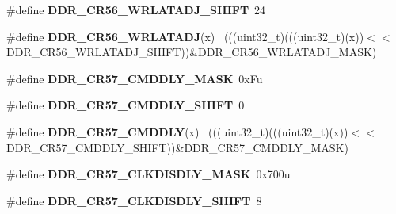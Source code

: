 \begin{DoxyCompactItemize}
\item 
\hypertarget{group___d_d_r___register___masks_ga09364cd52f56f3b15b0b7296675c16e8}{}\#define {\bfseries D\+D\+R\+\_\+\+C\+R56\+\_\+\+W\+R\+L\+A\+T\+A\+D\+J\+\_\+\+S\+H\+I\+F\+T}~24\label{group___d_d_r___register___masks_ga09364cd52f56f3b15b0b7296675c16e8}

\item 
\hypertarget{group___d_d_r___register___masks_ga6ff1818da114c647778871bdb9afc7b0}{}\#define {\bfseries D\+D\+R\+\_\+\+C\+R56\+\_\+\+W\+R\+L\+A\+T\+A\+D\+J}(x)                                      ~(((uint32\+\_\+t)(((uint32\+\_\+t)(x))$<$$<$D\+D\+R\+\_\+\+C\+R56\+\_\+\+W\+R\+L\+A\+T\+A\+D\+J\+\_\+\+S\+H\+I\+F\+T))\&D\+D\+R\+\_\+\+C\+R56\+\_\+\+W\+R\+L\+A\+T\+A\+D\+J\+\_\+\+M\+A\+S\+K)\label{group___d_d_r___register___masks_ga6ff1818da114c647778871bdb9afc7b0}

\item 
\hypertarget{group___d_d_r___register___masks_ga645c0dd904e468fae0f64fd100a80577}{}\#define {\bfseries D\+D\+R\+\_\+\+C\+R57\+\_\+\+C\+M\+D\+D\+L\+Y\+\_\+\+M\+A\+S\+K}~0x\+Fu\label{group___d_d_r___register___masks_ga645c0dd904e468fae0f64fd100a80577}

\item 
\hypertarget{group___d_d_r___register___masks_ga8b8ff5f5925da19838e9df97a881642e}{}\#define {\bfseries D\+D\+R\+\_\+\+C\+R57\+\_\+\+C\+M\+D\+D\+L\+Y\+\_\+\+S\+H\+I\+F\+T}~0\label{group___d_d_r___register___masks_ga8b8ff5f5925da19838e9df97a881642e}

\item 
\hypertarget{group___d_d_r___register___masks_ga4aca615bf06cf59349807213b4fd8047}{}\#define {\bfseries D\+D\+R\+\_\+\+C\+R57\+\_\+\+C\+M\+D\+D\+L\+Y}(x)                                          ~(((uint32\+\_\+t)(((uint32\+\_\+t)(x))$<$$<$D\+D\+R\+\_\+\+C\+R57\+\_\+\+C\+M\+D\+D\+L\+Y\+\_\+\+S\+H\+I\+F\+T))\&D\+D\+R\+\_\+\+C\+R57\+\_\+\+C\+M\+D\+D\+L\+Y\+\_\+\+M\+A\+S\+K)\label{group___d_d_r___register___masks_ga4aca615bf06cf59349807213b4fd8047}

\item 
\hypertarget{group___d_d_r___register___masks_ga487656b82d9005a342e37aa220fb8903}{}\#define {\bfseries D\+D\+R\+\_\+\+C\+R57\+\_\+\+C\+L\+K\+D\+I\+S\+D\+L\+Y\+\_\+\+M\+A\+S\+K}~0x700u\label{group___d_d_r___register___masks_ga487656b82d9005a342e37aa220fb8903}

\item 
\hypertarget{group___d_d_r___register___masks_gae86ab12bd6c5908bea510a8737e3f263}{}\#define {\bfseries D\+D\+R\+\_\+\+C\+R57\+\_\+\+C\+L\+K\+D\+I\+S\+D\+L\+Y\+\_\+\+S\+H\+I\+F\+T}~8\label{group___d_d_r___register___masks_gae86ab12bd6c5908bea510a8737e3f263}


\end{DoxyCompactItemize}
